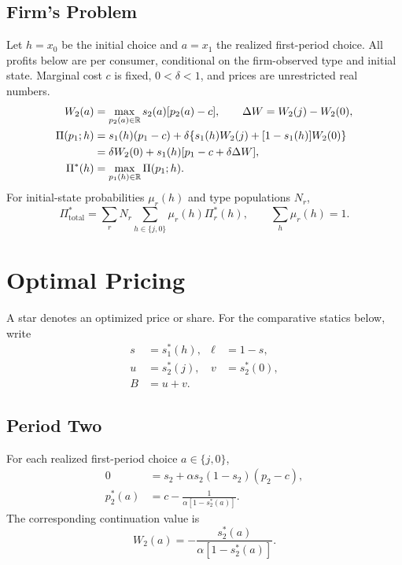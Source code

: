 \documentclass[12pt]{article}
\theoremstyle{definition}
\theoremstyle{remark}
\begin{document}
\subsection{Firm's Problem}
\label{subsec:firm-problem}
Let $h=x_0$ be the initial choice and $a=x_1$ the realized first-period choice.
All profits below are per consumer, conditional on the firm-observed type and initial state.
Marginal cost $c$ is fixed, $0<\delta<1$, and prices are unrestricted real numbers.
\begin{align}
 W_2(a)&=\max_{p_2(a)\in\mathbb R}s_2(a)[p_2(a)-c],
 \qquad \Delta W=W_2(j)-W_2(0),\\
 \Pi(p_1;h)&=s_1(h)(p_1-c)
 +\delta\{s_1(h)W_2(j)+[1-s_1(h)]W_2(0)\}\notag\\
 &=\delta W_2(0)+s_1(h)[p_1-c+\delta\Delta W],
 \label{eq:supply-profit}\\
 \Pi^*(h)&=\max_{p_1(h)\in\mathbb R}\Pi(p_1;h).
\end{align}
For initial-state probabilities $\mu_r(h)$ and type populations $N_r$,
\begin{equation}
 \Pi_{\mathrm{total}}^*=\sum_r N_r\sum_{h\in\{j,0\}}\mu_r(h)\Pi_r^*(h),
 \qquad \sum_h\mu_r(h)=1.
\end{equation}

\section{Optimal Pricing}
\label{sec:optimal-pricing}
A star denotes an optimized price or share. For the comparative statics below, write
\begin{align*}
 s&=s_1^*(h), & \ell&=1-s,\\
 u&=s_2^*(j), & v&=s_2^*(0),\\
 B&=u+v.
\end{align*}

\subsection{Period Two}
\label{subsec:foc}
For each realized first-period choice $a\in\{j,0\}$,
\begin{align}
 0&=s_2+\alpha s_2(1-s_2)(p_2-c),\\
 p_2^*(a)&=c-\frac{1}{\alpha[1-s_2^*(a)]}.
 \label{eq:supply-terminal}
\end{align}
The corresponding continuation value is
\begin{equation}
 W_2(a)=-\frac{s_2^*(a)}{\alpha[1-s_2^*(a)]}.
\end{equation}
\end{document}

